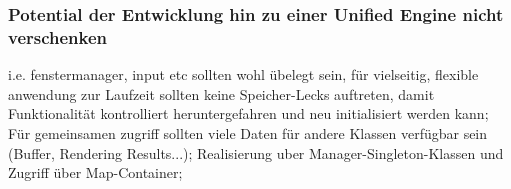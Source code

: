 	\subsubsection{Potential der Entwicklung hin zu einer Unified Engine nicht verschenken}
	i.e. fenstermanager, input etc sollten wohl übelegt sein, für vielseitig, flexible anwendung zur Laufzeit sollten keine 	Speicher-Lecks auftreten, damit Funktionalität kontrolliert heruntergefahren und neu initialisiert werden kann; Für 	
	gemeinsamen zugriff sollten viele Daten für andere Klassen verfügbar sein (Buffer, Rendering Results...); Realisierung 	
	uber Manager-Singleton-Klassen und Zugriff über Map-Container;


	
